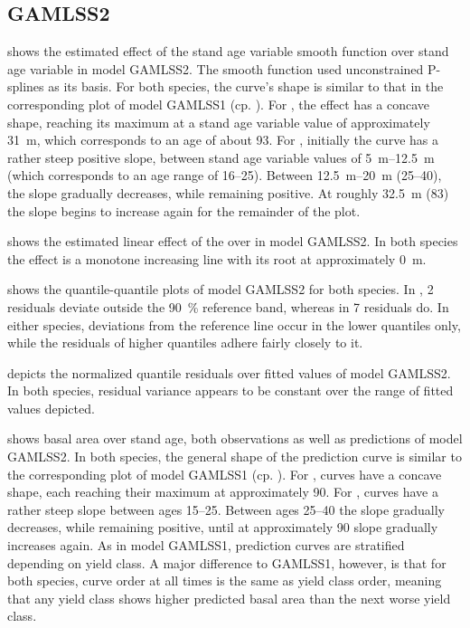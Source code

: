 \subsection{GAMLSS2}

 shows the estimated effect of the stand age variable smooth function over stand age variable in model GAMLSS2.  The smooth function used unconstrained P-splines as its basis.  For both species, the curve’s shape is similar to that in the corresponding plot of model GAMLSS1 (cp. ).  For \Beech{}, the effect has a concave shape, reaching its maximum at a stand age variable value of approximately \SI{31}{\meter}, which corresponds to an age of about \SI{93}{\year}.  For \Spruce{}, initially the curve has a rather steep positive slope, between stand age variable values of \SIrange{5}{12.5}{\meter} (which corresponds to an age range of \SIrange{16}{25}{\year}).  Between \SIrange{12.5}{20}{\meter} (\SIrange{25}{40}{\year}), the slope gradually decreases, while remaining positive. At roughly \SI{32.5}{\meter} (\SI{83}{\year}) the slope begins to increase again for the remainder of the plot.

 shows the estimated linear effect of the \ProductivityIndexVariableText{} over \ProductivityIndexVariableText{} in model GAMLSS2.  In both species the effect is a monotone increasing line with its root at approximately \SI{0}{\meter}.

 shows the quantile-quantile plots of model GAMLSS2 for both species.  In \Beech{}, 2 residuals deviate outside the \SI{90}{\percent} reference band, whereas in \Spruce{} 7 residuals do.  In either species, deviations from the reference line occur in the lower quantiles only, while the residuals of higher quantiles adhere fairly closely to it.

 depicts the normalized quantile residuals over fitted values of model GAMLSS2.  In both species, residual variance appears to be constant over the range of fitted values depicted.

 shows basal area over stand age, both observations as well as predictions of model GAMLSS2.  In both species, the general shape of the prediction curve is similar to the corresponding plot of model GAMLSS1 (cp. ).  For \Beech{}, curves have a concave shape, each reaching their maximum at approximately \SI{90}{\year}.  For \Spruce{}, curves have a rather steep slope between ages \SIrange{15}{25}{\year}.  Between ages \SIrange{25}{40}{\year} the slope gradually decreases, while remaining positive, until at approximately \SI{90}{\year} slope gradually increases again.  As in model GAMLSS1, prediction curves are stratified depending on yield class.  A major difference to GAMLSS1, however, is that for both species, curve order at all times is the same as yield class order, meaning that any yield class shows higher predicted basal area than the next worse yield class.

